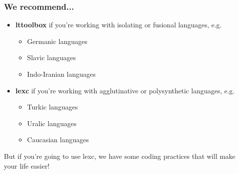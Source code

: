 \documentclass[10pt,xetex]{beamer} %
\begin{document}
\begin{frame}
  \frametitle{We recommend...}

\begin{itemize}
  \item {\bf lttoolbox} if you're working with isolating or fusional languages, e.g.
    \begin{itemize}
      \item Germanic languages
      \item Slavic languages
      \item Indo-Iranian languages
    \end{itemize}
  \item {\bf lexc} if you're working with agglutinative or polysynthetic languages, e.g.
    \begin{itemize}
      \item Turkic languages
      \item Uralic languages
      \item Caucasian languages
    \end{itemize}
\end{itemize}

But if you're going to use lexc, we have some coding practices that will make your life easier!

\end{frame}
\end{document}
